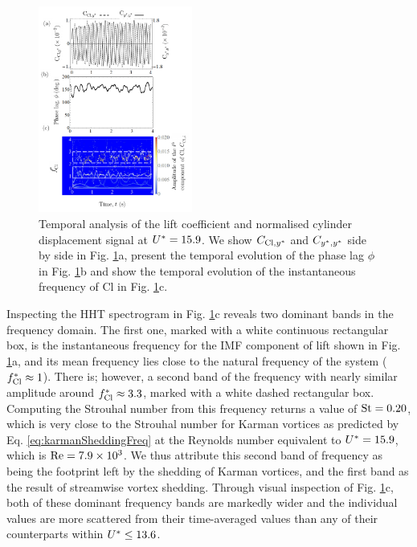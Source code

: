 \documentclass[a4paper,fleqn]{cas-sc}
\begin{document}
\begin{figure}
  \centering
  \includegraphics[width=0.45\textwidth]{figs/figure16}
  \caption{Temporal analysis of the lift coefficient and normalised cylinder displacement signal at $U^{*} = 15.9$. We show $C_{\text{Cl},y^{*}}$ and $C_{y^{*},y^{*}}$ side by side in Fig. \ref{fig:tempAnalysisTransition}a, present the temporal evolution of the phase lag $\phi$ in Fig. \ref{fig:tempAnalysisTransition}b and show the temporal evolution of the instantaneous frequency of Cl in Fig. \ref{fig:tempAnalysisTransition}c.}
  \label{fig:tempAnalysisTransition}
\end{figure}

Inspecting the HHT spectrogram in Fig. \ref{fig:tempAnalysisTransition}c reveals two dominant bands in the frequency domain. The first one, marked with a white continuous rectangular box, is the instantaneous frequency for the IMF component of lift shown in Fig. \ref{fig:tempAnalysisTransition}a, and its mean frequency lies close to the natural frequency of the system ($f_{\text{Cl}}^{*} \approx 1$). There is; however, a second band of the frequency with nearly similar amplitude around $f_{\text{Cl}}^{*} \approx 3.3$, marked with a white dashed rectangular box. Computing the Strouhal number from this frequency returns a value of $\text{St} = 0.20$, which is very close to the Strouhal number for Karman vortices as predicted by Eq. \ref{eq:karmanSheddingFreq} at the Reynolds number equivalent to $U^{*} = 15.9$, which is $\text{Re} = 7.9 \times 10^{3}$. We thus attribute this second band of frequency as being the footprint left by the shedding of Karman vortices, and the first band as the result of streamwise vortex shedding. Through visual inspection of Fig. \ref{fig:tempAnalysisTransition}c, both of these dominant frequency bands are markedly wider and the individual values are more scattered from their time-averaged values than any of their counterparts within $U^{*} \leq 13.6$.
\end{document}
